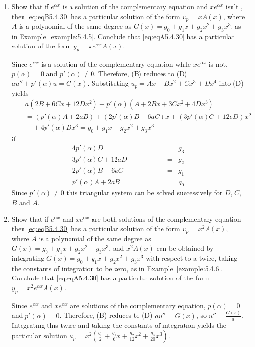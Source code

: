 \documentclass{ximera}
\begin{document}
\begin{problem}
\begin{enumerate}
\item %
Show that if $e^{\alpha x}$ is a solution of the complementary
equation and $xe^{\alpha x}$ isn't , then \ref{eq:eqB5.4.30} has a
particular solution of the form $u_p=xA(x)$, where $A$ is a polynomial
of the same degree as $G(x)=g_0+g_1x+g_2x^2+g_3x^3$, as in Example~\ref{example:5.4.5}. Conclude
that \ref{eq:eqA5.4.30} has a particular solution of the form
$y_p=xe^{\alpha x}A(x)$.
\begin{solution}
Since $e^{\alpha x}$ is a solution of the complementary equation while
$xe^{\alpha x}$ is not, $p(\alpha)=0$ and $p'(\alpha)\ne0$. Therefore,
(B) reduces to  (D) $au''+p'(\alpha)u=G(x)$.
Substituting $u_p=Ax+Bx^2+Cx^3+Dx^4$ into (D) yields
\begin{eqnarray*}
&&a(2B+6Cx+12Dx^2)+p'(\alpha)(A+2Bx+3Cx^2+4Dx^3)\\
&&=(p'(\alpha)A+2aB)+(2p'(\alpha)B+6aC)x
+(3p'(\alpha)C +12aD)x^2\\  &&\quad+4p'(\alpha)Dx^3=
g_0+g_1x+g_2x^2+g_3x^3
\end{eqnarray*}
 if
$$
\begin{array}{rcr}
4p'(\alpha)D&=&g_3\\
3p'(\alpha)C+12aD&=&g_2\\
2p'(\alpha)B+6aC\phantom{+12aD}&=&g_1\\
p'(\alpha)A+2aB\phantom{+6aC+12aD}&=&g_0.
\end{array}
$$
Since $p'(\alpha)\ne0$ this triangular system can be solved
successively for $D$, $C$, $B$ and $A$.
\end{solution}

\item %
Show that if $e^{\alpha x}$ and $xe^{\alpha x}$ are both solutions of
the complementary equation then \ref{eq:eqB5.4.30} has a
particular solution of the form $u_p=x^2A(x)$, where $A$ is a
polynomial of the same degree as $G(x)=g_0+g_1x+g_2x^2+g_3x^3$, and $x^2A(x)$ can be obtained by
integrating $G(x)=g_0+g_1x+g_2x^2+g_3x^3$ with respect to a twice, taking the constants of integration to be
zero, as in Example~\ref{example:5.4.6}. Conclude that
\ref{eq:eqA5.4.30} has a particular solution of the form
$y_p=x^2e^{\alpha x}A(x)$.
\begin{solution}
Since $e^{\alpha x}$ and $xe^{\alpha x}$ are solutions of the
complementary equation,
 $p(\alpha)=0$ and $p'(\alpha)=0$. Therefore,
(B) reduces to  (D) $au''=G(x)$, so $u''=\frac{G(x)}{a}$.
Integrating this twice and taking the constants of integration yields
the particular solution $u_p=x^2\left(\frac{g_0}{2}+
\frac{g_1}{6}x+\frac{g_2}{12}x^2+\frac{g_3}{20}x^3\right)$.
\end{solution}
\end{enumerate}
\end{problem}
\end{document}
